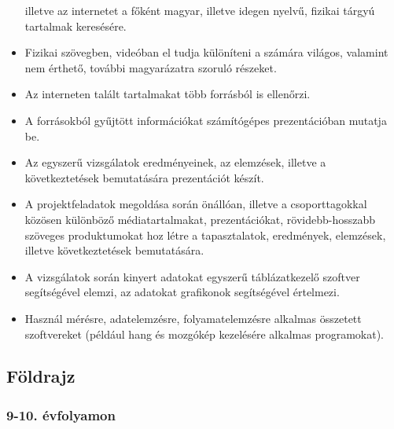 \begin{itemize}
  illetve az internetet a főként magyar, illetve idegen nyelvű, fizikai
  tárgyú tartalmak keresésére.
\item
  Fizikai szövegben, videóban el tudja különíteni a számára világos,
  valamint nem érthető, további magyarázatra szoruló részeket.
\item
  Az interneten talált tartalmakat több forrásból is ellenőrzi.
\item
  A forrásokból gyűjtött információkat számítógépes prezentációban
  mutatja be.
\item
  Az egyszerű vizsgálatok eredményeinek, az elemzések, illetve a
  következtetések bemutatására prezentációt készít.
\item
  A projektfeladatok megoldása során önállóan, illetve a csoporttagokkal
  közösen különböző médiatartalmakat, prezentációkat, rövidebb-hosszabb
  szöveges produktumokat hoz létre a tapasztalatok, eredmények,
  elemzések, illetve következtetések bemutatására.
\item
  A vizsgálatok során kinyert adatokat egyszerű táblázatkezelő szoftver
  segítségével elemzi, az adatokat grafikonok segítségével értelmezi.
\item
  Használ mérésre, adatelemzésre, folyamatelemzésre alkalmas összetett
  szoftvereket (például hang és mozgókép kezelésére alkalmas
  programokat).
\end{itemize}

\hypertarget{foldrajz}{%
\subsection{Földrajz}\label{foldrajz}}

\hypertarget{evfolyamon-17}{%
\subsubsection{9-10. évfolyamon}\label{evfolyamon-17}}

